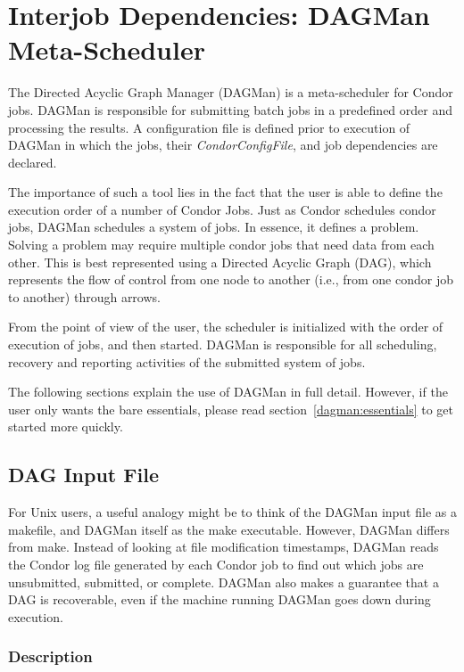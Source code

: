 \section{Interjob Dependencies: DAGMan Meta-Scheduler}
\label{sec:DAGMan}

The Directed Acyclic Graph Manager (DAGMan) is a meta-scheduler for Condor
jobs.  DAGMan is responsible for submitting batch jobs in a predefined order
and processing the results. A configuration file is defined prior to execution
of DAGMan in which the jobs, their \textit{CondorConfigFile}, and job
dependencies are declared.

The importance of such a tool lies in the fact that the user is able to define
the execution order of a number of Condor Jobs. Just as Condor schedules
condor jobs, DAGMan schedules a system of jobs. In essence, it defines a
problem. Solving a problem may require multiple condor jobs that need data
from each other. This is best represented using a Directed Acyclic Graph
(DAG), which represents the flow of control from one node to another (i.e.,
from one condor job to another) through arrows.

From the point of view of the user, the scheduler is initialized with the
order of execution of jobs, and then started. DAGMan is responsible for all
scheduling, recovery and reporting activities of the submitted system of jobs.

The following sections explain the use of DAGMan in full detail.  However, if
the user only wants the bare essentials, please read
section~\ref{dagman:essentials} to get started more quickly.

\subsection{DAG Input File}

For Unix users, a useful analogy might be to think of the DAGMan input file as
a makefile, and DAGMan itself as the make executable.  However, DAGMan differs
from make.  Instead of looking at file modification timestamps, DAGMan reads
the Condor log file generated by each Condor job to find out which jobs are
unsubmitted, submitted, or complete.  DAGMan also makes a guarantee that a DAG
is recoverable, even if the machine running DAGMan goes down during execution.

\subsubsection{Description}
\label{dagman:dagdesc}

